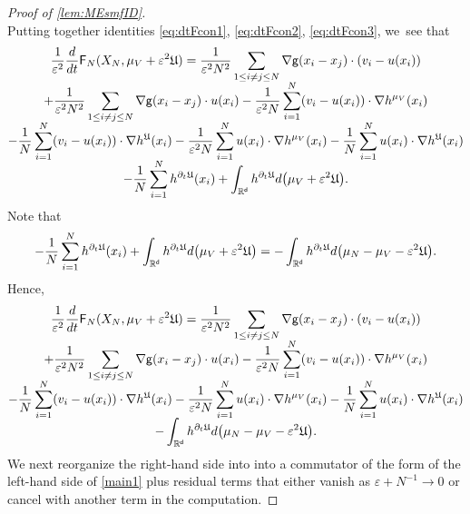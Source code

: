 \documentclass[JEP,XML,SOM,Unicode,published]{cedram}
\theoremstyle{plain}
\theoremstyle{definition}
\DeclarePairedDelimiter{\pa}{\lparen}{\rparen}
\newcommand{\R}{{\mathbb{R}}}
\let\vep\varepsilon
\let\p\partial
\let\ux X
\newcommand{\Uu}{\mathfrak{U}}
\newcommand{\Fr}{\mathsf{F}}
\renewcommand{\d}{\mathsf{d}}
\newcommand{\g}{{\mathsf{g}}}
\begin{document}
\begin{proof}[Proof of \cref{lem:MEsmfID}]
\begin{equation}
\end{equation}
Putting together identities \eqref{eq:dtFcon1}, \eqref{eq:dtFcon2}, \eqref{eq:dtFcon3}, we~see that\vspace*{-5pt}
\begin{multline*}
\frac{1}{\vep^2}\frac{d}{dt} \Fr_N(\ux_N, \mu_V + \vep^2\Uu) = \frac{1}{\vep^2 N^2}\sum_{1\leq i\neq j\leq N} \nabla\g(x_i-x_j)\cdot \pa*{v_i - u(x_i)} \\[-5pt]
+ \frac{1}{\vep^2N^2}\sum_{1\leq i\neq j\leq N}\nabla\g(x_i-x_j)\cdot u(x_i) -\frac{1}{\vep^2 N}\sum_{i=1}^N \pa*{v_i-u(x_i)}\cdot\nabla h^{\mu_V}(x_i) \\[-5pt]
- \frac{1}{N}\sum_{i=1}^N \pa*{v_i-u(x_i)} \cdot \nabla h^{\Uu}(x_i) -\frac{1}{\vep^2 N}\sum_{i=1}^N u(x_i)\cdot\nabla h^{\mu_V}(x_i)- \frac{1}{N}\sum_{i=1}^N u(x_i) \cdot \nabla h^{\Uu}(x_i)\\[-5pt]
- \frac{1}{N}\sum_{i=1}^N h^{\p_t\Uu}(x_i) + \int_{\R^\d} h^{\p_t\Uu}d\pa*{\mu_V+\vep^2\Uu}.
\end{multline*}
Note that\vspace*{-5pt}
\begin{equation*}
- \frac{1}{N}\sum_{i=1}^N h^{\p_t\Uu}(x_i) + \int_{\R^\d}h^{\p_t\Uu}d\pa*{\mu_V+\vep^2\Uu} =-\int_{\R^\d}h^{\p_t\Uu}d\pa*{\mu_N-\mu_V-\vep^2\Uu}.
\end{equation*}
Hence,\vspace*{-5pt}
\begin{multline}\label{eq:dtFcon'}
\frac{1}{\vep^2}\frac{d}{dt} \Fr_N(\ux_N, \mu_V + \vep^2\Uu) = {\frac{1}{\vep^2 N^2}\sum_{1\leq i\neq j\leq N} \nabla\g(x_i-x_j)\cdot \pa*{v_i - u(x_i)}} \\[-5pt]
+ \frac{1}{\vep^2N^2}\sum_{1\leq i\neq j\leq N}\nabla\g(x_i-x_j)\cdot u(x_i) -\frac{1}{\vep^2 N}\sum_{i=1}^N (v_i-u(x_i))\cdot\nabla h^{\mu_V}(x_i) \\[-5pt]
- \frac{1}{N}\sum_{i=1}^N (v_i-u(x_i)) \cdot \nabla h^{\Uu}(x_i)-\frac{1}{\vep^2N}\sum_{i=1}^N u(x_i)\cdot\nabla h^{\mu_V}(x_i) -\frac{1}{N}\sum_{i=1}^N u(x_i)\cdot\nabla h^{\Uu}(x_i) \\[-5pt]
-\int_{\R^\d} h^{\p_t\Uu}d\pa*{\mu_N-\mu_V-\vep^2\Uu}.
\end{multline}
We next reorganize the right-hand side into into a commutator of the form of the left-hand side of \eqref{main1} plus residual terms that either vanish as $\vep+N^{-1}\to 0$ or cancel with another term in the computation.


\end{proof}
\end{document}
